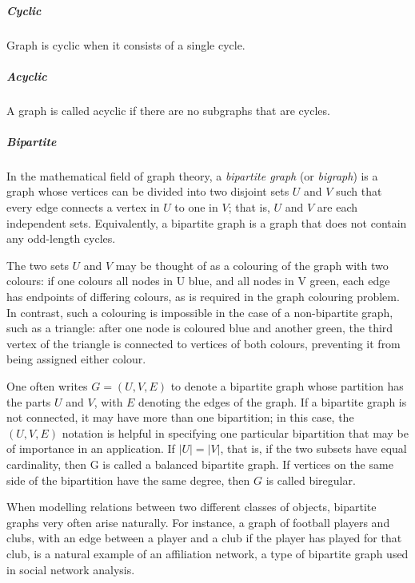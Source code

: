         \subparagraph{Cyclic}
        
          Graph is cyclic when it consists of a single cycle.
          
        \subparagraph{Acyclic}
        
          A graph is called acyclic if there are no subgraphs that are cycles.

        \subparagraph{Bipartite}
        
          In the mathematical field of graph theory, a \emph{bipartite graph} (or \emph{bigraph}) is a graph whose vertices can be divided into two disjoint sets $U$ and $V$ such that every edge connects a vertex in $U$ to one in $V$; that is, $U$ and $V$ are each independent sets. Equivalently, a bipartite graph is a graph that does not contain any odd-length cycles.\cite{Diestel2012,AsratianDenleyHaggkvist}

          The two sets $U$ and $V$ may be thought of as a colouring of the graph with two colours: if one colours all nodes in U blue, and all nodes in V green, each edge has endpoints of differing colours, as is required in the graph colouring problem.\cite{AsratianDenleyHaggkvist,Scheinerman2012} In contrast, such a colouring is impossible in the case of a non-bipartite graph, such as a triangle: after one node is coloured blue and another green, the third vertex of the triangle is connected to vertices of both colours, preventing it from being assigned either colour.
          
          One often writes $G=(U,V,E)$ to denote a bipartite graph whose partition has the parts $U$ and $V$, with $E$ denoting the edges of the graph. If a bipartite graph is not connected, it may have more than one bipartition;\cite{ChartrandZhang2008} in this case, the $(U,V,E)$ notation is helpful in specifying one particular bipartition that may be of importance in an application. If $|U|=|V|$, that is, if the two subsets have equal cardinality, then G is called a balanced bipartite graph.\cite{AsratianDenleyHaggkvist} If vertices on the same side of the bipartition have the same degree, then $G$ is called biregular.
          
          When modelling relations between two different classes of objects, bipartite graphs very often arise naturally. For instance, a graph of football players and clubs, with an edge between a player and a club if the player has played for that club, is a natural example of an affiliation network, a type of bipartite graph used in social network analysis.\cite{WassermanFaust1994}

